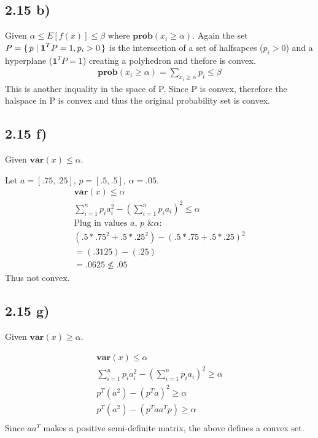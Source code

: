 \documentclass[12pt]{article}
\begin{document}
\subsection*{2.15 b)}
Given $\alpha \le E[f(x)] \le \beta$ where $\textbf{prob}(x_i \ge \alpha)$.
Again the set $P = \set{p | \textbf{1}^TP = 1, p_i > 0}$ is the intersection of a set of halfsapces ($p_i>0$) and a hyperplane ($\textbf{1}^TP = 1$) creating a polyhedron and thefore is convex.
\begin{align*}
\textbf{prob}(x_i \ge \alpha) = \sum_{x_i\ge\alpha}p_i \le \beta
\end{align*}
This is another inquality in the space of P. Since P is convex, therefore the halspace in P is convex and thus the original probability set is convex.

\subsection*{2.15 f)}
Given $\textbf{var}(x)\le \alpha$.

Let $a = [.75, .25]$, $p = [.5, .5]$, $\alpha = .05$.
\begin{align*}
\textbf{var}(x)\le \alpha\\
\sum_{i=1}^{n}p_ia_i^2 - (\sum_{i=1}^{n}p_ia_i)^2 \le \alpha\\
\text{Plug in values $a$, $p$ \& $\alpha$:}\\
(.5*.75^2+.5*.25^2)- (.5*.75+.5*.25)^2\\
= (.3125) - (.25)\\
=.0625 \not\le .05
\end{align*}
Thus not convex.

\subsection*{2.15 g)}
Given $\textbf{var}(x)\ge \alpha$.

\begin{align*}
\textbf{var}(x)\le \alpha\\
\sum_{i=1}^{n}p_ia_i^2 - (\sum_{i=1}^{n}p_ia_i)^2 \ge \alpha\\
p^T(a^2) - (p^Ta)^2 \ge \alpha\\
p^T(a^2) - (p^Taa^Tp) \ge \alpha\\
\end{align*}
Since $aa^T$ makes a positive semi-definite matrix, the above defines a convex set.
\end{document}
